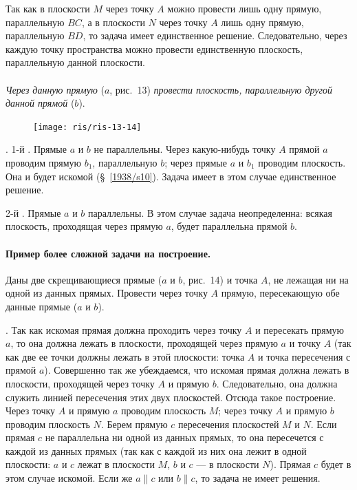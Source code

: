 \documentclass[twoside]{book}
\begin{document}
Так как в плоскости $M$ через точку $A$ можно провести лишь одну прямую, параллельную $BC$, а в плоскости $N$ через точку $A$ лишь одну прямую, параллельную $BD$, то задача имеет единственное решение.
Следовательно, через каждую точку пространства можно провести единственную плоскость, параллельную данной плоскости.

\paragraph{}\label{1938/s21}
\emph{Через данную прямую} ($a$, рис.~13) \emph{провести плоскость, параллельную другой данной прямой} ($b$).

\begin{figure}[h!]
\centering
\texttt{[image: ris/ris-13-14]}
\caption{}
\end{figure}

.
1-й .
Прямые $a$ и $b$ не параллельны.
Через какую-нибудь точку $A$ прямой $a$ проводим прямую $b_1$, параллельную $b$;
через прямые $a$ и $b_1$ проводим плоскость.
Она и будет искомой (§~\ref{1938/s10}).
Задача имеет в этом случае единственное решение.

2-й .
Прямые $a$ и $b$ параллельны.
В этом случае задача неопределенна: всякая плоскость, проходящая через прямую $a$, будет параллельна прямой $b$.

\paragraph{Пример более сложной задачи на построение.}\label{1938/s22}
Даны две скрещивающиеся прямые ($a$ и $b$, рис.~14) и точка $A$, не лежащая ни на одной из данных прямых.
Провести через точку $A$ прямую, пересекающую обе данные прямые ($a$ и $b$).

.
Так как искомая прямая должна проходить через точку $A$ и пересекать прямую $a$, то она должна лежать в плоскости, проходящей через прямую $a$ и точку $A$ (так как две ее точки должны лежать в этой плоскости: точка $A$ и точка пересечения с прямой $a$).
Совершенно так же убеждаемся, что искомая прямая должна лежать в плоскости, проходящей через точку $A$ и прямую $b$.
Следовательно, она должна служить линией пересечения этих двух плоскостей.
Отсюда такое построение.
Через точку $A$ и прямую $a$ проводим плоскость $M$;
через точку $A$ и прямую $b$ проводим плоскость $N$.
Берем прямую $c$ пересечения плоскостей $M$ и $N$.
Если прямая $c$ не параллельна ни одной из данных прямых, то она пересечется с каждой из данных прямых (так как с каждой из них она лежит в одной плоскости: $a$ и $c$ лежат в плоскости $M$, $b$ и $c$ --- в плоскости $N$).
Прямая $c$ будет в этом случае искомой.
Если же $a\parallel c$ или $b\parallel c$, то задача не имеет решения.
\end{document}

